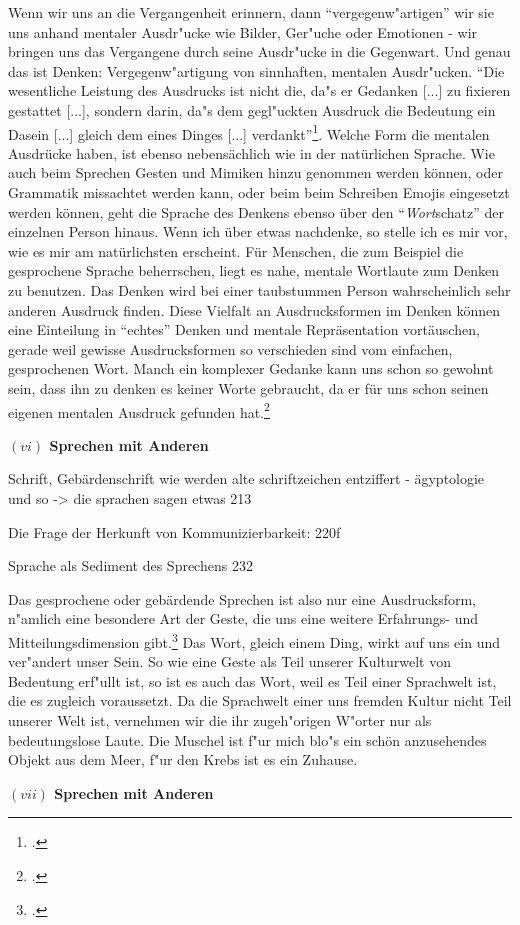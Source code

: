 \documentclass[a4paper, 12pt]{article}
\begin{document}
\begin{onehalfspace}
Wenn wir uns an die Vergangenheit erinnern, dann "`vergegenw"artigen"' wir sie uns anhand mentaler Ausdr"ucke wie Bilder, Ger"uche oder Emotionen - wir bringen uns das Vergangene durch seine Ausdr"ucke in die Gegenwart. Und genau das ist Denken: Vergegenw"artigung von sinnhaften, mentalen Ausdr"ucken. "`Die wesentliche Leistung des Ausdrucks ist nicht die, da"s er Gedanken [...] zu fixieren gestattet [...], sondern darin, da"s dem gegl"uckten Ausdruck die Bedeutung ein Dasein [...] gleich dem eines Dinges [...] verdankt"'\footnote{\Cite[Siehe][S. 216]{merleau1966phanomenologie}.}. Welche Form die mentalen Ausdrücke haben, ist ebenso nebensächlich wie in der natürlichen Sprache. Wie auch beim Sprechen Gesten und Mimiken hinzu genommen werden können, oder Grammatik missachtet werden kann, oder beim beim Schreiben Emojis eingesetzt werden können, geht die Sprache des Denkens ebenso über den "`\emph{Wort}schatz"' der einzelnen Person hinaus. Wenn ich über etwas nachdenke, so stelle ich es mir vor, wie es mir am natürlichsten erscheint. Für Menschen, die zum Beispiel die gesprochene Sprache beherrschen, liegt es nahe, mentale Wortlaute zum Denken zu benutzen. Das Denken wird bei einer taubstummen Person wahrscheinlich sehr anderen Ausdruck finden. Diese Vielfalt an Ausdrucksformen im Denken können eine Einteilung in "`echtes"' Denken und mentale Repräsentation vortäuschen, gerade weil gewisse Ausdrucksformen so verschieden sind vom einfachen, gesprochenen Wort. Manch ein komplexer Gedanke kann uns schon so gewohnt sein, dass ihn zu denken es keiner Worte gebraucht, da er für uns schon seinen eigenen mentalen Ausdruck gefunden hat.\footnote{\Cite[Vgl.][S. 217]{merleau1966phanomenologie}.} 

\vspace{5mm}

\noindent\textbf{$(vi)$ Sprechen mit Anderen}

\noindent 


Schrift, Gebärdenschrift
wie werden alte schriftzeichen entziffert - ägyptologie und so
	-> die sprachen sagen etwas 213
	
Die Frage der Herkunft von Kommunizierbarkeit: 220f

Sprache als Sediment des Sprechens 232
	
Das gesprochene oder gebärdende Sprechen ist also nur eine Ausdrucksform, n"amlich eine besondere Art der Geste, die uns eine weitere Erfahrungs- und Mitteilungsdimension gibt.\footnote{\cite[Vgl.][S. 216 f.]{merleau1966phanomenologie}.} Das Wort, gleich einem Ding, wirkt auf uns ein und ver"andert unser Sein. So wie eine Geste als Teil unserer Kulturwelt von Bedeutung erf"ullt ist, so ist es auch das Wort, weil es Teil einer Sprachwelt ist, die es zugleich voraussetzt. Da die Sprachwelt einer uns fremden Kultur nicht Teil unserer Welt ist, vernehmen wir die ihr zugeh"origen W"orter nur als bedeutungslose Laute. Die Muschel ist f"ur mich blo"s ein schön anzusehendes Objekt aus dem Meer, f"ur den Krebs ist es ein Zuhause. 

\vspace{5mm}

\noindent\textbf{$(vii)$ Sprechen mit Anderen}

\noindent



\end{onehalfspace}
\nocite{*}
%
\printbibliography
\end{document}
